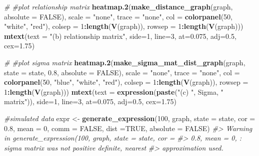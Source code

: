 \documentclass[]{article}
\newenvironment{Shaded}{\begin{snugshade}}{\end{snugshade}}
\newcommand{\CommentTok}[1]{\textcolor[rgb]{0.56,0.35,0.01}{\textit{#1}}}
\newcommand{\DataTypeTok}[1]{\textcolor[rgb]{0.13,0.29,0.53}{#1}}
\newcommand{\DecValTok}[1]{\textcolor[rgb]{0.00,0.00,0.81}{#1}}
\newcommand{\FloatTok}[1]{\textcolor[rgb]{0.00,0.00,0.81}{#1}}
\newcommand{\KeywordTok}[1]{\textcolor[rgb]{0.13,0.29,0.53}{\textbf{#1}}}
\newcommand{\NormalTok}[1]{#1}
\newcommand{\OperatorTok}[1]{\textcolor[rgb]{0.81,0.36,0.00}{\textbf{#1}}}
\newcommand{\OtherTok}[1]{\textcolor[rgb]{0.56,0.35,0.01}{#1}}
\newcommand{\StringTok}[1]{\textcolor[rgb]{0.31,0.60,0.02}{#1}}
\begin{document}
\begin{Shaded}
\begin{Highlighting}[]
\CommentTok{# #plot relationship matrix}
\KeywordTok{heatmap.2}\NormalTok{(}\KeywordTok{make_distance_graph}\NormalTok{(graph, }\DataTypeTok{absolute =} \OtherTok{FALSE}\NormalTok{),}
          \DataTypeTok{scale =} \StringTok{"none"}\NormalTok{, }\DataTypeTok{trace =} \StringTok{"none"}\NormalTok{, }\DataTypeTok{col =} \KeywordTok{colorpanel}\NormalTok{(}\DecValTok{50}\NormalTok{, }\StringTok{"white"}\NormalTok{, }\StringTok{"red"}\NormalTok{),}
\DataTypeTok{colsep =} \DecValTok{1}\OperatorTok{:}\KeywordTok{length}\NormalTok{(}\KeywordTok{V}\NormalTok{(graph)), }\DataTypeTok{rowsep =} \DecValTok{1}\OperatorTok{:}\KeywordTok{length}\NormalTok{(}\KeywordTok{V}\NormalTok{(graph)))}
\KeywordTok{mtext}\NormalTok{(}\DataTypeTok{text =} \StringTok{"(b) relationship matrix"}\NormalTok{, }\DataTypeTok{side=}\DecValTok{1}\NormalTok{, }\DataTypeTok{line=}\DecValTok{3}\NormalTok{, }\DataTypeTok{at=}\FloatTok{0.075}\NormalTok{, }\DataTypeTok{adj=}\FloatTok{0.5}\NormalTok{, }\DataTypeTok{cex=}\FloatTok{1.75}\NormalTok{)}

\CommentTok{# #plot sigma matrix}
\KeywordTok{heatmap.2}\NormalTok{(}\KeywordTok{make_sigma_mat_dist_graph}\NormalTok{(graph, }\DataTypeTok{state =}\NormalTok{ state, }\FloatTok{0.8}\NormalTok{, }\DataTypeTok{absolute =} \OtherTok{FALSE}\NormalTok{),}
\DataTypeTok{scale =} \StringTok{"none"}\NormalTok{, }\DataTypeTok{trace =} \StringTok{"none"}\NormalTok{, }\DataTypeTok{col =} \KeywordTok{colorpanel}\NormalTok{(}\DecValTok{50}\NormalTok{, }\StringTok{"blue"}\NormalTok{, }\StringTok{"white"}\NormalTok{, }\StringTok{"red"}\NormalTok{),}
\DataTypeTok{colsep =} \DecValTok{1}\OperatorTok{:}\KeywordTok{length}\NormalTok{(}\KeywordTok{V}\NormalTok{(graph)), }\DataTypeTok{rowsep =} \DecValTok{1}\OperatorTok{:}\KeywordTok{length}\NormalTok{(}\KeywordTok{V}\NormalTok{(graph)))}
\KeywordTok{mtext}\NormalTok{(}\DataTypeTok{text =} \KeywordTok{expression}\NormalTok{(}\KeywordTok{paste}\NormalTok{(}\StringTok{"(c) "}\NormalTok{, Sigma, }\StringTok{" matrix"}\NormalTok{)), }\DataTypeTok{side=}\DecValTok{1}\NormalTok{, }\DataTypeTok{line=}\DecValTok{3}\NormalTok{, }\DataTypeTok{at=}\FloatTok{0.075}\NormalTok{, }\DataTypeTok{adj=}\FloatTok{0.5}\NormalTok{, }\DataTypeTok{cex=}\FloatTok{1.75}\NormalTok{)}

\CommentTok{#simulated data}
\NormalTok{expr <-}\StringTok{ }\KeywordTok{generate_expression}\NormalTok{(}\DecValTok{100}\NormalTok{, graph,  }\DataTypeTok{state =}\NormalTok{ state, }\DataTypeTok{cor =} \FloatTok{0.8}\NormalTok{, }\DataTypeTok{mean =} \DecValTok{0}\NormalTok{,}
\DataTypeTok{comm =} \OtherTok{FALSE}\NormalTok{, }\DataTypeTok{dist =}\OtherTok{TRUE}\NormalTok{, }\DataTypeTok{absolute =} \OtherTok{FALSE}\NormalTok{)}
\CommentTok{#> Warning in generate_expression(100, graph, state = state, cor =}
\CommentTok{#> 0.8, mean = 0, : sigma matrix was not positive definite, nearest}
\CommentTok{#> approximation used.}


\end{Highlighting}
\end{Shaded}
\end{document}
